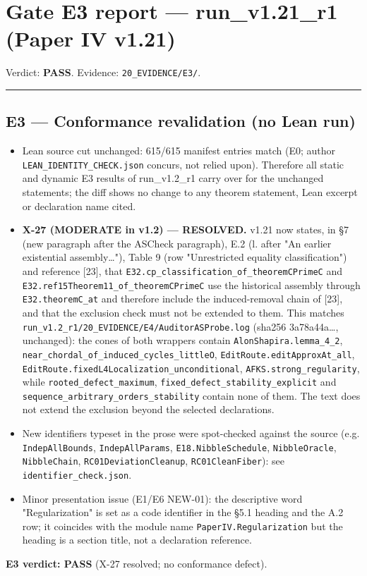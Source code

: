 \documentclass[
]{article}
\author{}
\date{}
\providecommand{\tightlist}{%
  \setlength{\itemsep}{0pt}\setlength{\parskip}{0pt}}
\begin{document}
\section{Gate E3 report --- run\_v1.21\_r1 (Paper IV
v1.21)}\label{gate-e3-report--run_v121_r1-paper-iv-v121}

Verdict: \textbf{PASS}. Evidence: \texttt{20\_EVIDENCE/E3/}.

\begin{center}\rule{0.5\linewidth}{0.5pt}\end{center}

\subsection{E3 --- Conformance revalidation (no Lean
run)}\label{e3--conformance-revalidation-no-lean-run}

\begin{itemize}
\tightlist
\item
  Lean source cut unchanged: 615/615 manifest entries match (E0; author
  \texttt{LEAN\_IDENTITY\_CHECK.json} concurs, not relied upon).
  Therefore all static and dynamic E3 results of run\_v1.2\_r1 carry
  over for the unchanged statements; the diff shows no change to any
  theorem statement, Lean excerpt or declaration name cited.
\item
  \textbf{X-27 (MODERATE in v1.2) --- RESOLVED.} v1.21 now states, in §7
  (new paragraph after the ASCheck paragraph), E.2 (l. after "An earlier
  existential assembly\ldots"), Table 9 (row "Unrestricted equality
  classification") and reference {[}23{]}, that
  \texttt{E32.cp\_classification\_of\_theoremCPrimeC} and
  \texttt{E32.ref15Theorem11\_of\_theoremCPrimeC} use the historical
  assembly through \texttt{E32.theoremC\_at} and therefore include the
  induced-removal chain of {[}23{]}, and that the exclusion check must
  not be extended to them. This matches
  \texttt{run\_v1.2\_r1/20\_EVIDENCE/E4/AuditorASProbe.log} (sha256
  3a78a44a\ldots, unchanged): the cones of both wrappers contain
  \texttt{AlonShapira.lemma\_4\_2},
  \texttt{near\_chordal\_of\_induced\_cycles\_littleO\textquotesingle{}},
  \texttt{EditRoute.editApproxAt\_all},
  \texttt{EditRoute.fixedL4Localization\_unconditional},
  \texttt{AFKS.strong\_regularity}, while
  \texttt{rooted\_defect\_maximum},
  \texttt{fixed\_defect\_stability\_explicit} and
  \texttt{sequence\_arbitrary\_orders\_stability} contain none of them.
  The text does not extend the exclusion beyond the selected
  declarations.
\item
  New identifiers typeset in the prose were spot-checked against the
  source (e.g. \texttt{IndepAllBounds}, \texttt{IndepAllParams},
  \texttt{E18.NibbleSchedule}, \texttt{NibbleOracle},
  \texttt{NibbleChain}, \texttt{RC01DeviationCleanup},
  \texttt{RC01CleanFiber}): see \texttt{identifier\_check.json}.
\item
  Minor presentation issue (E1/E6 NEW-01): the descriptive word
  "Regularization" is set as a code identifier in the §5.1 heading and
  the A.2 row; it coincides with the module name
  \texttt{PaperIV.Regularization} but the heading is a section title,
  not a declaration reference.
\end{itemize}

\textbf{E3 verdict: PASS} (X-27 resolved; no conformance defect).
\end{document}
